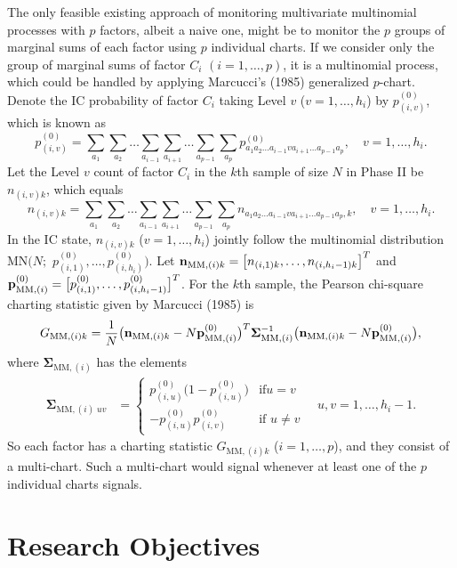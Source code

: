 The only feasible existing approach of monitoring multivariate multinomial processes
with $p$ factors, albeit a naive one, might be to monitor the $p$ groups of marginal
sums of each factor using $p$ individual charts. If we consider only the group of
marginal sums of factor $C_i$ $(i=1,\ldots,p)$, it is a multinomial process, which
could be handled by applying Marcucci's (1985) generalized $p$-chart. Denote the IC
probability of factor $C_i$ taking Level $v$ ($v=1,\ldots,h_i$) by
$p^{(0)}_{(i,v)}$, which is known as
\[
p^{(0)}_{(i,v)}=\sum_{a_1}\sum_{a_2}\ldots\sum_{a_{i-1}}\sum_{a_{i+1}}\ldots
\sum_{a_{p-1}}\sum_{a_p}p^{(0)}_{a_1a_2\ldots a_{i-1}va_{i+1}\ldots
a_{p-1}a_p},\quad v=1,\ldots,h_i.
\]
Let the Level $v$ count of factor $C_i$ in the $k$th sample of size $N$ in Phase II
be $n_{(i,v)k}$, which equals
\[
n_{(i,v)k}=\sum_{a_1}\sum_{a_2}\ldots\sum_{a_{i-1}}\sum_{a_{i+1}}\ldots
\sum_{a_{p-1}}\sum_{a_p}n_{a_1a_2\ldots a_{i-1}va_{i+1}\ldots a_{p-1}a_p,k},\quad
v=1,\ldots,h_i.
\]
In the IC state, $n_{(i,v)k}$ ($v=1,\ldots,h_i$) jointly follow the multinomial
distribution $\mbox{MN}\big(N;$ $p^{(0)}_{(i,1)},\ldots,p^{(0)}_{(i,h_i)}\big)$. Let
${\bf n}_{\mathrm{MM},(i)k}=\big[n_{(i,1)k},\ldots,n_{(i,h_i-1)k}\big]^T$ and ${\bf
p}^{(0)}_{\mathrm{MM},(i)}=\big[p^{(0)}_{(i,1)},\ldots,p^{(0)}_{(i,h_i-1)}\big]^T$.
For the $k$th sample, the Pearson chi-square charting statistic given by Marcucci
(1985) is
\begin{equation}
G_{\mathrm{MM},(i)k}=\frac{1}{N}\big({\bf n}_{\mathrm{MM},(i)k}-N{\bf
p}^{(0)}_{\mathrm{MM},(i)}\big)^T\bm{\Sigma}^{-1}_{\mathrm{MM},(i)} \big({\bf
n}_{\mathrm{MM},(i)k}-N{\bf p}^{(0)}_{\mathrm{MM},(i)}\big),\label{F1.2}
\end{equation}
where $\bm{\Sigma}_{\mathrm{MM},(i)}$ has the elements
\begin{align*}
\bm{\Sigma}_{\mathrm{MM},(i)\;uv}&=\left\{\begin{array}{ll}p^{(0)}_{(i,u)}
\big(1-p^{(0)}_{(i,u)}\big)&\textrm{if
$u=v$}\\-p^{(0)}_{(i,u)}p^{(0)}_{(i,v)}&\textrm{if $u\ne v$}\end{array}\right.\quad
u,v=1,\ldots,h_i-1.
\end{align*}
So each factor has a charting statistic $G_{\mathrm{MM},(i)k}$ ($i=1,\ldots,p$), and
they consist of a multi-chart. Such a multi-chart would signal whenever at least one
of the $p$ individual charts signals.



\section{Research Objectives}\label{sec1.3}

